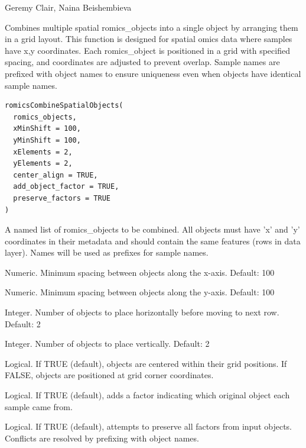 \documentclass[a4paper]{book}
\begin{document}
%
\begin{Author}
Geremy Clair, Naina Beishembieva
\end{Author}
%
\begin{Description}
Combines multiple spatial romics\_objects into a single object by arranging them in a grid layout.
This function is designed for spatial omics data where samples have x,y coordinates. Each romics\_object
is positioned in a grid with specified spacing, and coordinates are adjusted to prevent overlap.
Sample names are prefixed with object names to ensure uniqueness even when objects have identical sample names.
\end{Description}
%
\begin{Usage}
\begin{verbatim}
romicsCombineSpatialObjects(
  romics_objects,
  xMinShift = 100,
  yMinShift = 100,
  xElements = 2,
  yElements = 2,
  center_align = TRUE,
  add_object_factor = TRUE,
  preserve_factors = TRUE
)
\end{verbatim}
\end{Usage}
%
\begin{Arguments}
\begin{ldescription}
\item[\code{romics\_objects}] A named list of romics\_objects to be combined. All objects must have 'x' and 'y'
coordinates in their metadata and should contain the same features (rows in data layer).
Names will be used as prefixes for sample names.

\item[\code{xMinShift}] Numeric. Minimum spacing between objects along the x-axis. Default: 100

\item[\code{yMinShift}] Numeric. Minimum spacing between objects along the y-axis. Default: 100

\item[\code{xElements}] Integer. Number of objects to place horizontally before moving to next row. Default: 2

\item[\code{yElements}] Integer. Number of objects to place vertically. Default: 2

\item[\code{center\_align}] Logical. If TRUE (default), objects are centered within their grid positions.
If FALSE, objects are positioned at grid corner coordinates.

\item[\code{add\_object\_factor}] Logical. If TRUE (default), adds a factor indicating which
original object each sample came from.

\item[\code{preserve\_factors}] Logical. If TRUE (default), attempts to preserve all factors
from input objects. Conflicts are resolved by prefixing with object names.
\end{ldescription}
\end{Arguments}
\end{document}
